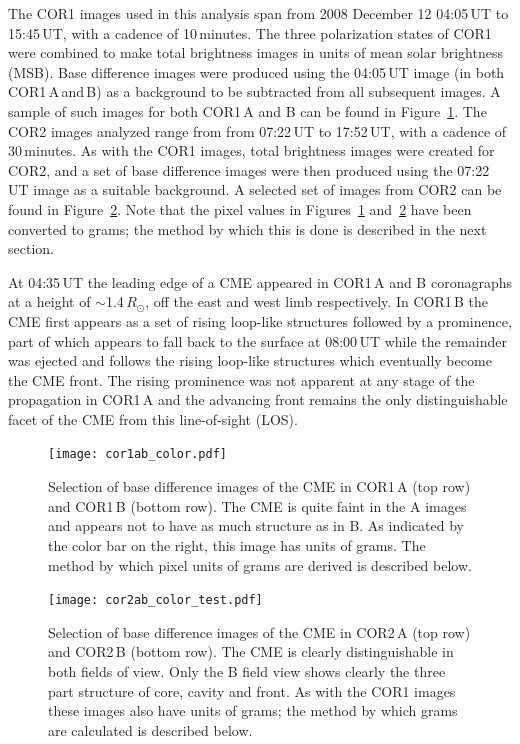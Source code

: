 The COR1 images used in this analysis span from 2008 December 12 04:05\,UT to 15:45\,UT, with a cadence of 10\,minutes. The three polarization states of COR1 were combined to make total brightness images in units of mean solar brightness (MSB). Base difference images were produced using the 04:05\,UT image (in both COR1\,A\,and\,B) as a background to be subtracted from all subsequent images. A sample of such images for both COR1\,A and B can be found in Figure~\ref{fig:STEREO_COR1A&B}. The COR2 images analyzed range from from 07:22\,UT to 17:52\,UT, with a cadence of 30\,minutes. As with the COR1 images, total brightness images were created for COR2, and a set of base difference images were then produced using the 07:22\,UT image as a suitable background. A selected set of images from COR2 can be found in Figure~\ref{fig:STEREO_COR2A&B}. Note that the pixel values in Figures~\ref{fig:STEREO_COR1A&B} and~\ref{fig:STEREO_COR2A&B}  have been converted to grams; the method by which this is done is described in the next section.
	
At 04:35\,UT the leading edge of a CME appeared in COR1\,A and B coronagraphs at a height of $\sim$1.4\,$R_{\odot}$, off the east and west limb respectively. In COR1\,B the CME first appears as a set of rising loop-like structures followed by a prominence, part of which appears to fall back to the surface at 08:00\,UT while the remainder was ejected and follows the rising loop-like structures which eventually become the CME front. The rising prominence was not apparent at any stage of the propagation in COR1\,A and the advancing front remains the only distinguishable facet 
of the CME from this line-of-sight (LOS).
\begin{figure}
    \centering
	\texttt{[image: cor1ab\_color.pdf]}
	\caption [2008-December-12 CME observed by COR1] {Selection of base difference images of the CME in COR1\,A  
	(top row) and COR1\,B (bottom row). The CME is quite faint in the A images and appears not to have as much structure
	as in B. As indicated by the color bar on the right, this image has units of grams. The method by which pixel units of 		grams are derived is described below.}
\label{fig:STEREO_COR1A&B}
\end{figure}

\begin{figure}
    \centering
    \texttt{[image: cor2ab\_color\_test.pdf]}
	\caption [2008-December-12 CMe observed by COR2]{Selection of base difference images of the CME in COR2\,A (top 	row) and COR2\,B (bottom row). The CME is 
	clearly distinguishable in both fields of view. Only the B field view shows clearly the three part structure of core, cavity 	and front. As with the COR1 images these images also have units of grams; the method by which grams are calculated is described below.}
\label{fig:STEREO_COR2A&B}
\end{figure}    

